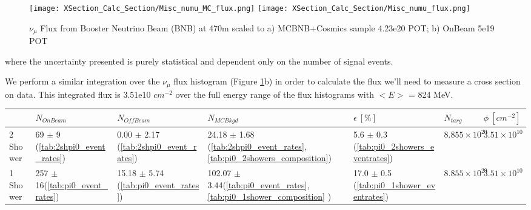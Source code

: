 \documentclass{article}
\begin{document}
\begin{figure}[h!]
\centering
\texttt{[image: XSection\_Calc\_Section/Misc\_numu\_MC\_flux.png]}
\texttt{[image: XSection\_Calc\_Section/Misc\_numu\_flux.png]}

\caption{$\nu_\mu$ Flux from Booster Neutrino Beam (BNB) at 470m scaled to a) MCBNB+Cosmics sample 4.23e20 POT; b) OnBeam 5e19 POT}
\label{fig:flux}
\end{figure}

\noindent where the uncertainty presented is purely statistical and dependent only on the number of signal events.  


\par We perform a similar integration over the $\nu_\mu$ flux histogram (Figure \ref{fig:flux}b) in order to calculate the flux we'll need to measure a cross section on data. This integrated flux is 3.51e10 $cm^{-2}$ over the full energy range of the flux histograms with $<E>$ = 824 MeV. 

\begin{table*}
\centering
{}
 \begin{tabular}{|l|l|l|l|l|l|l|}
 \hline
 & $N_{OnBeam}$ & $N_{OffBeam}$ & $N_{MCBkgd}$ & $\epsilon~[\%]$ & $N_{targ}$ & $\phi ~[cm^{-2}]$  \\ [0.1ex] \hline
2 Shower & 69 $\pm$ 9 (\ref{tab:2shpi0_event_rates}) & 0.00 $\pm$ 2.17 (\ref{tab:2shpi0_event_rates}) & 24.18 $\pm$ 1.68 (\ref{tab:2shpi0_event_rates}, \ref{tab:pi0_2showers_composition}) & 5.6 $\pm$ 0.3 (\ref{tab:pi0_2showers_eventrates}) & $8.855\times10^{29}$ & $3.51\times10^{10}$\\ \hline
1 Shower & 257 $\pm$ 16(\ref{tab:pi0_event_rates}) & 15.18 $\pm$ 5.74 (\ref{tab:pi0_event_rates}) & 102.07 $\pm$ 3.44(\ref{tab:pi0_event_rates}, \ref{tab:pi0_1shower_composition} ) & 17.0 $\pm$ 0.5 (\ref{tab:pi0_1shower_eventrates}) & $8.855\times10^{29}$ & $3.51\times10^{10}$\\ \hline

\end{tabular}
\end{table*}
\end{document}

